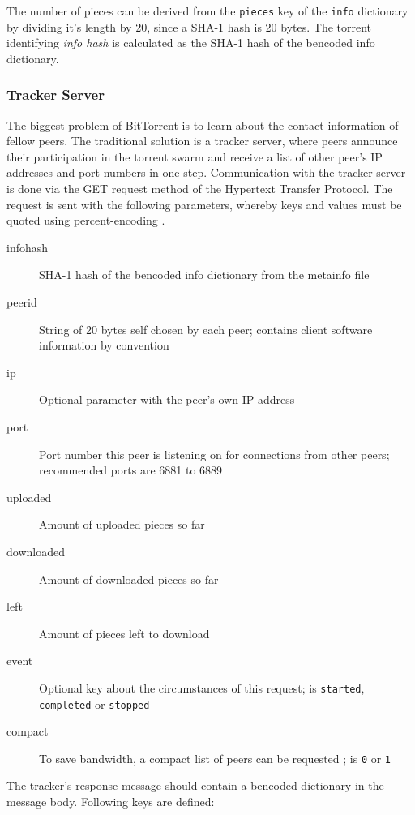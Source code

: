 \documentclass[10pt, a4paper]{scrartcl} %
\renewcommand{\_}{\origunderscore\allowbreak}
\begin{document}
The number of pieces can be derived from the \texttt{pieces} key of the \texttt{info} dictionary by dividing it's length by 20, since a SHA-1 hash is 20 bytes. The torrent identifying \emph{info hash} is calculated as the SHA-1 hash of the bencoded info dictionary.

\subsubsection{Tracker Server}
The biggest problem of BitTorrent is to learn about the contact information of fellow peers. The traditional solution is a tracker server, where peers announce their participation in the torrent swarm and receive a list of other peer's IP addresses and port numbers in one step. Communication with the tracker server is done via the GET request method of the Hypertext Transfer Protocol. The request is sent with the following parameters, whereby keys and values must be quoted using percent-encoding \cite[§~2.1]{percent}.

\begin{description}
  \item[info\_hash] SHA-1 hash of the bencoded info dictionary from the metainfo file
  \item[peer\_id] String of 20 bytes self chosen by each peer; contains client software information by convention
  \item[ip] Optional parameter with the peer's own IP address
  \item[port] Port number this peer is listening on for connections from other peers; recommended ports are 6881 to 6889
  \item[uploaded] Amount of uploaded pieces so far
  \item[downloaded] Amount of downloaded pieces so far
  \item[left] Amount of pieces left to download
  \item[event] Optional key about the circumstances of this request; is \texttt{started}, \texttt{completed} or \texttt{stopped}
  \item[compact] To save bandwidth, a compact list of peers can be requested \cite{bep23}; is \texttt{0} or \texttt{1}
\end{description}

The tracker's response message should contain a bencoded dictionary in the message body. Following keys are defined:
\end{document}
